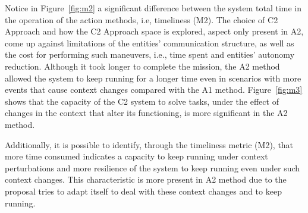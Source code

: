 Notice in Figure~\ref{fig:m2} a significant difference between the system total time in the operation of the action methods, i.e, timeliness (M2). The choice of C2 Approach and how the C2 Approach space is explored, aspect only present in A2, come up against limitations of the entities' communication structure, as well as the cost for performing such maneuvers, i.e., time spent and entities' autonomy reduction. Although it took longer to complete the mission, the A2 method allowed the system to keep running for a longer time even in scenarios with more events that cause context changes compared with the A1 method. Figure~\ref{fig:m3} shows that the capacity of the C2 system to solve tasks, under the effect of changes in the context that alter its functioning, is more significant in the A2 method. 

Additionally, it is possible to identify, through the timeliness metric (M2), that more time consumed indicates a capacity to keep running under context perturbations and more resilience of the system to keep running even under such context changes. This characteristic is more present in A2 method due to the proposal tries to adapt itself to deal with these context changes and to keep running. 

